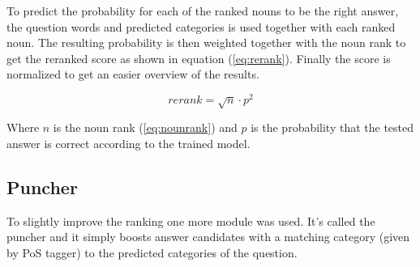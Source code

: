 To predict the probability for each of the ranked nouns to be the right answer, the question words and predicted categories
is used together with each ranked noun. The resulting probability is then weighted together with the noun rank to get the
reranked score as shown in equation (\ref{eq:rerank}). Finally the score is normalized to get an easier overview of the results.

\begin{equation}
rerank = \sqrt{n} \cdot p^2
\label{eq:rerank}
\end{equation}

Where $n$ is the noun rank (\ref{eq:nounrank}) and $p$ is the probability that the tested answer is correct according 
to the trained model.

\subsection{Puncher}

To slightly improve the ranking one more module was used. It's called the puncher and it simply boosts 
answer candidates with a matching category (given by PoS tagger) to the predicted categories of the question. 
